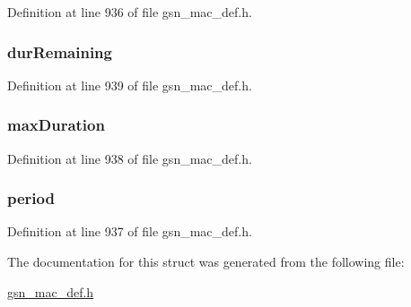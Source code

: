 Definition at line 936 of file gsn\_\-mac\_\-def.h.

\hypertarget{a00112_aab5bdb906588480c72e73aac245666b2}{
\subsubsection[{durRemaining}]{ {\bf durRemaining}}}
\label{a00112_aab5bdb906588480c72e73aac245666b2}


Definition at line 939 of file gsn\_\-mac\_\-def.h.

\hypertarget{a00112_a87b558313920210457d2d31f932fa47c}{
\subsubsection[{maxDuration}]{ {\bf maxDuration}}}
\label{a00112_a87b558313920210457d2d31f932fa47c}


Definition at line 938 of file gsn\_\-mac\_\-def.h.

\hypertarget{a00112_a83c873c8e939f66c2e0b67a9307918da}{
\subsubsection[{period}]{ {\bf period}}}
\label{a00112_a83c873c8e939f66c2e0b67a9307918da}


Definition at line 937 of file gsn\_\-mac\_\-def.h.



The documentation for this struct was generated from the following file:\begin{DoxyCompactItemize}
\item 
\hyperlink{a00522}{gsn\_\-mac\_\-def.h}\end{DoxyCompactItemize}
